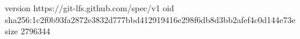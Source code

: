 version https://git-lfs.github.com/spec/v1
oid sha256:1c2f0b93fa2872e3832d777bbd412919416e298f6db8d3bb2afef4c0d144e73e
size 2796344

